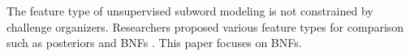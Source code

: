 \documentclass[a4paper]{article}
\begin{document}
The feature type of unsupervised subword modeling is not constrained by challenge organizers. Researchers proposed various feature types for comparison such as posteriors \cite{heck2017feature,ansari2017unsupervised,shibata2017composite} and BNFs \cite{yuan2017extracting,chen2017multilingual,shibata2017composite}.
This paper focuses on BNFs.


\end{document}
